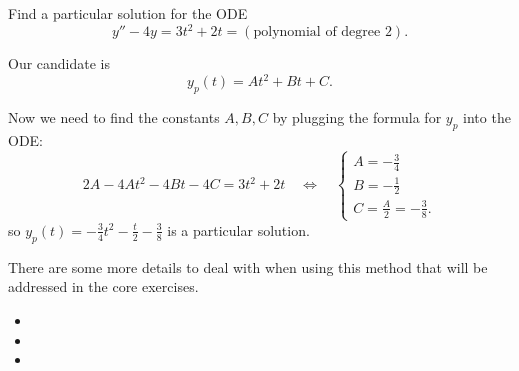 \begin{example}
Find a particular solution for the ODE
$$
y''  - 4y = 3t^2+2t = (\text{polynomial of degree 2}).
$$	

Our candidate is
$$
y_p(t) = At^2 + Bt + C.
$$

Now we need to find the constants $A, B, C$ by plugging the formula for $y_p$ into the ODE:
$$
2A - 4At^2 - 4B t - 4C = 3t^2+2t
\quad \Leftrightarrow \quad 
\begin{cases}
A = -\frac34 \\
B = -\frac12 \\
C = \frac{A}{2} = -\frac38.	
\end{cases}
$$
so $y_p(t) = -\frac34 t^2 - \frac{t}{2} - \frac38$ is a particular solution.
\end{example}

There are some more details to deal with when using this method that will be addressed in the core exercises.




\begin{video}
\begin{itemize}
	\item {}
	\item {}
	\item {}
\end{itemize}	
\end{video}




